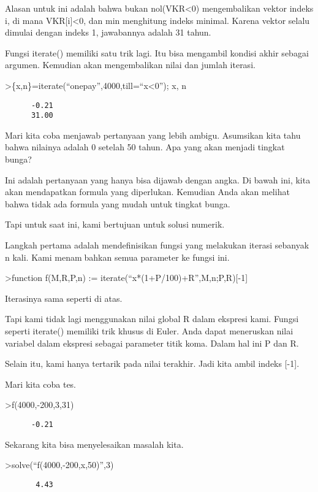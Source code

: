 \documentclass[
]{book}
\begin{document}
Alasan untuk ini adalah bahwa bukan nol(VKR\textless0) mengembalikan vektor indeks i, di mana VKR{[}i{]}\textless0, dan min menghitung indeks minimal. Karena vektor selalu dimulai dengan indeks 1, jawabannya adalah 31 tahun.

Fungsi iterate() memiliki satu trik lagi. Itu bisa mengambil kondisi akhir sebagai argumen. Kemudian akan mengembalikan nilai dan jumlah iterasi.

\textgreater\{x,n\}=iterate(``onepay'',4000,till=``x\textless0''); x, n

\begin{verbatim}
      -0.21 
      31.00 
\end{verbatim}

Mari kita coba menjawab pertanyaan yang lebih ambigu. Asumsikan kita tahu bahwa nilainya adalah 0 setelah 50 tahun. Apa yang akan menjadi tingkat bunga?

Ini adalah pertanyaan yang hanya bisa dijawab dengan angka. Di bawah ini, kita akan mendapatkan formula yang diperlukan. Kemudian Anda akan melihat bahwa tidak ada formula yang mudah untuk tingkat bunga.

Tapi untuk saat ini, kami bertujuan untuk solusi numerik.

Langkah pertama adalah mendefinisikan fungsi yang melakukan iterasi sebanyak n kali. Kami menambahkan semua parameter ke fungsi ini.

\textgreater function f(M,R,P,n) := iterate(``x*(1+P/100)+R'',M,n;P,R){[}-1{]}

Iterasinya sama seperti di atas.

Tapi kami tidak lagi menggunakan nilai global R dalam ekspresi kami. Fungsi seperti iterate() memiliki trik khusus di Euler. Anda dapat meneruskan nilai variabel dalam ekspresi sebagai parameter titik koma. Dalam hal ini P dan R.

Selain itu, kami hanya tertarik pada nilai terakhir. Jadi kita ambil indeks {[}-1{]}.

Mari kita coba tes.

\textgreater f(4000,-200,3,31)

\begin{verbatim}
      -0.21 
\end{verbatim}

Sekarang kita bisa menyelesaikan masalah kita.

\textgreater solve(``f(4000,-200,x,50)'',3)

\begin{verbatim}
       4.43 
\end{verbatim}
\end{document}
